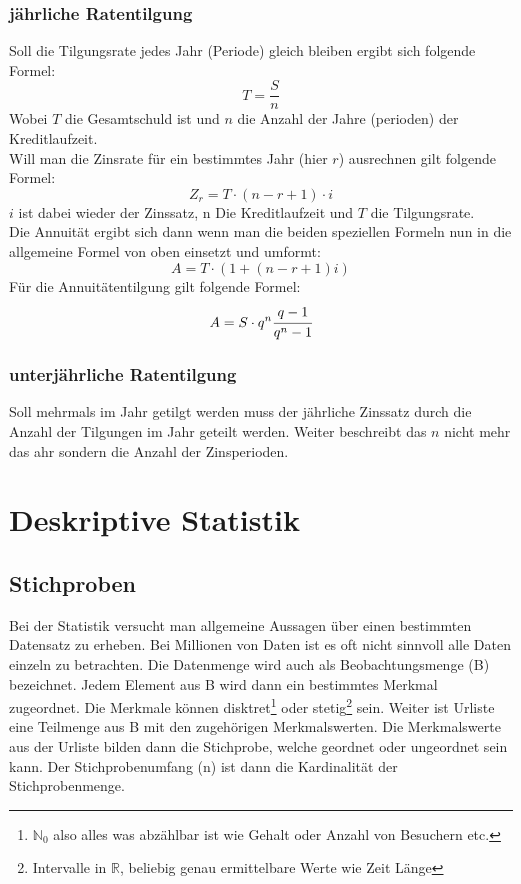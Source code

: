 \documentclass[a4paper]{scrartcl}
\begin{document}
            \subsubsection{jährliche Ratentilgung}
            Soll die Tilgungsrate jedes Jahr (Periode) gleich bleiben ergibt sich folgende Formel:
            \begin{equation*}
                T = \frac{S}{n}
            \end{equation*}
            Wobei \(T\) die Gesamtschuld ist und \(n\) die Anzahl der Jahre (perioden) der Kreditlaufzeit.\\
            Will man die Zinsrate für ein bestimmtes Jahr (hier \(r\)) ausrechnen gilt folgende Formel: 
            \begin{equation*}
                Z_r = T \cdot (n - r + 1) \cdot i
            \end{equation*} 
            \(i\) ist dabei wieder der Zinssatz, n Die Kreditlaufzeit und \(T\) die Tilgungsrate. \\
            Die Annuität ergibt sich dann wenn man die beiden speziellen Formeln nun in die allgemeine Formel von oben einsetzt und umformt: 
            \begin{equation*}
                A = T \cdot (1 + (n - r + 1)i)
            \end{equation*}
            Für die Annuitätentilgung gilt folgende Formel: 
            \begin{equation*}
                A = S \cdot q^n \cfrac{q - 1}{q^n - 1}
            \end{equation*}
            \subsubsection{unterjährliche Ratentilgung}
            Soll mehrmals im Jahr getilgt werden muss der jährliche Zinssatz durch die Anzahl der Tilgungen im Jahr geteilt werden. Weiter beschreibt das \(n\) nicht mehr das ahr sondern die Anzahl
            der Zinsperioden.  

    \section{Deskriptive Statistik}
        \subsection{Stichproben}
            Bei der Statistik versucht man allgemeine Aussagen über einen bestimmten Datensatz zu erheben. Bei Millionen von Daten ist es oft nicht sinnvoll alle 
            Daten einzeln zu betrachten. Die Datenmenge wird auch als Beobachtungsmenge (B) bezeichnet. Jedem Element aus B wird dann ein bestimmtes Merkmal zugeordnet.
            Die Merkmale können disktret\footnote{\(\mathbb{N}_0\) also alles was abzählbar ist wie Gehalt oder Anzahl von Besuchern etc.} oder stetig\footnote{Intervalle in \(\mathbb{R}\), beliebig genau ermittelbare Werte
            wie Zeit Länge} sein. Weiter ist Urliste eine Teilmenge aus B mit den zugehörigen Merkmalswerten. Die Merkmalswerte aus der Urliste bilden dann die Stichprobe, welche 
            geordnet oder ungeordnet sein kann. Der Stichprobenumfang (n) ist dann die Kardinalität der Stichprobenmenge.
\end{document}
